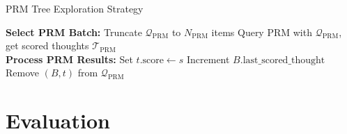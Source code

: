 \documentclass[11pt,twoside]{report}
\begin{document}
\begin{algorithm}[H]\label{alg:prmtreesearch}
\caption{PRM Tree Exploration Strategy}
\begin{algorithmic}[1]
    \Statex \textbf{Select PRM Batch:}
    \State Truncate $\mathcal{Q}_{\text{PRM}}$ to $N_{\text{PRM}}$ items
    \State Query PRM with $\mathcal{Q}_{\text{PRM}}$, get scored thoughts $\mathcal{T}_{\text{PRM}}$ \\
    \Statex \textbf{Process PRM Results:}
        \State Set $t.\text{score} \gets s$
        \State Increment $B.\text{last\_scored\_thought}$
        \State Remove $(B, t)$ from $\mathcal{Q}_{\text{PRM}}$
    \EndFor
\end{algorithmic}
\end{algorithm}

\chapter{Evaluation}

\end{document}
